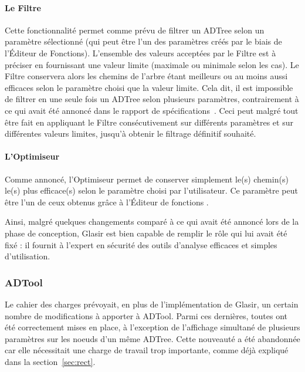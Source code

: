 \paragraph{Le Filtre} Cette fonctionnalité permet comme prévu de filtrer un ADTree selon un paramètre sélectionné (qui peut être l'un des paramètres créés par le biais de l'Éditeur de Fonctions). L'ensemble des valeurs acceptées par le Filtre est à préciser en fournissant une valeur limite (maximale ou minimale selon les cas). Le Filtre conservera alors les chemins de l'arbre étant meilleurs ou au moins aussi efficaces selon le paramètre choisi que la valeur limite. Cela dit, il est impossible de filtrer en une seule fois un ADTree selon plusieurs paramètres, contrairement à ce qui avait été annoncé dans le rapport de spécifications~\cite{spec_fonc}. Ceci peut malgré tout être fait en appliquant le Filtre consécutivement sur différents paramètres et sur différentes valeurs limites, jusqu'à obtenir le filtrage définitif souhaité.

\paragraph{L'Optimiseur} Comme annoncé, l'Optimiseur permet de conserver simplement le(s) chemin(s) le(s) plus efficace(s) selon le paramètre choisi par l'utilisateur. Ce paramètre peut être l'un de ceux obtenus grâce à l'Éditeur de fonctions .

Ainsi, malgré quelques changements comparé à ce qui avait été annoncé lors de la phase de conception, Glasir est bien capable de remplir le rôle qui lui avait été fixé :  il fournit à l'expert en sécurité des outils d'analyse efficaces et simples d'utilisation. 

\subsubsection{ADTool}
\label{sssec:obj_adtool}

Le cahier des charges prévoyait, en plus de l'implémentation de Glasir, un certain nombre de modifications à apporter à ADTool. Parmi ces dernières, toutes ont été correctement mises en place, à l'exception de l'affichage simultané de plusieurs paramètres sur les noeuds d'un même ADTree. Cette nouveauté a été abandonnée car elle nécessitait une charge de travail trop importante, comme déjà expliqué dans la {\sc section}~\ref{sec:rect}.

